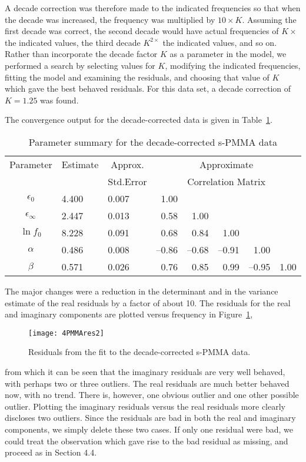 \begin{example}
A decade correction was therefore made to the indicated
frequencies so that when the decade was increased, the
frequency was multiplied by $10\times K$.
Assuming the
first decade was correct, the second decade would have
actual frequencies of $K \times$ the indicated values, the
third decade $K^{2\times} $ the indicated values, and so
on.
Rather than incorporate the decade factor $K$ as a
parameter in the model, we performed a search by selecting
values for $K$, modifying the indicated frequencies,
fitting the model and examining the residuals, and choosing
that value of $K$ which gave the best behaved residuals.
For this data set, a decade correction of $K = 1.25 $ was
found.

The convergence output for the decade-corrected data is
given in
Table~\ref{tbl:4.3}.
\begin{table}
  \caption{\label{tbl:4.3}
  Parameter summary for the decade-corrected s-PMMA data
  }
  \begin{center}
    \begin{tabular}{cllrrrrr}\hline
      \multicolumn{1}{c}{Parameter} & \multicolumn{1}{c}{Estimate} &
      \multicolumn{1}{c}{Approx.} & \multicolumn{5}{c}{Approximate}\\
      && \multicolumn{1}{c}{Std.Error} &
      \multicolumn{5}{c}{Correlation Matrix}\\ \hline
      $\epsilon_{0}$&4.400&0.007&1.00\\
      $\epsilon_{\infty}$&2.447&0.013&0.58&1.00\\
      $\ln f_{0}$&8.228&0.091&0.68&0.84&1.00\\
      $\alpha$&0.486&0.008&--\/0.86&--\/0.68&--\/0.91&1.00\\
      $\beta$&0.571&0.026&0.76&0.85&0.99&--\/0.95&1.00\\ \hline
    \end{tabular}
  \end{center}
\end{table}
The major changes were a reduction in the determinant and in
the variance estimate of the real residuals by
a factor of about 10.
The residuals for the real and imaginary components are
plotted versus frequency in
Figure~\ref{fig:PMMAres2},
\begin{figure}
  \centerline{\texttt{[image: 4PMMAres2]}}%
  \caption{\label{fig:PMMAres2}
  Residuals from the fit to the decade-corrected s-PMMA data.
  }
\end{figure}
from which it can be seen that the imaginary residuals are
very well behaved, with perhaps two or three outliers.
The real residuals are much better behaved now, with no trend.
There is, however, one obvious outlier and one other
possible outlier.
Plotting the imaginary residuals versus the real residuals
more clearly discloses two outliers.
Since the residuals are bad in both the real and imaginary components,
we simply delete these two cases.
If only one residual were bad, we could treat the
observation which gave rise to the bad residual as missing, and
proceed as in Section 4.4.


\end{example}
